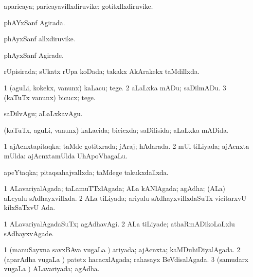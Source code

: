 {\bentry
{} 
\gl{\nA}
\expl{}
\bmng
 aparicaya; paricayavillxdiruvike; gotitxllxdiruvike. 
\emng
\eentry

\bentry
{} 
\gl{\gu}
\expl{}
\bmng
phAYxSanf Agirada. 
\emng
\eentry

\bentry
{} 
\gl{\nA}
\expl{}
\bmng
phAyxSanf allxdiruvike. 
\emng
\eentry

\bentry
{} 
\gl{\kirxvi}
\expl{}
\bmng
phAyxSanf Agirade. 
\emng
\eentry

\bentry
{} 
\gl{\gu}
\expl{}
\bmng
 rUpisirada; sUkatx rUpa koDada; takakx AkArakekx taMdillxda. 
\emng
\eentry

\bentry
{} 
\gl{\sakirx}
\expl{}
\bmng
\bnum
\num{1} (aguLi, kokekx, \mo vanunx) kaLacu; tege. 
\num{2} aLaLxka mADu; saDilmADu. 
\num{3} (kaTuTx \mo vanunx) bicucx; tege. 
\enum
\emng

\noindent
\gl{\akirx}
\expl{}
\bmng
saDilvAgu; aLaLxkavAgu. 
\emng
\eentry

\bentry
{} 
\gl{\gu}
\expl{}
\bmng
 (kaTuTx, aguLi, \mo vanunx) kaLacida; bicicxda; saDilisida; aLaLxka mADida. 
\emng
\eentry

\bentry
{} 
\gl{\gu}
\expl{}
\bmng
\bnum
\num{1} ajAcnxtapitaqka; taMde gotitxrada; jAraj; hAdarada. 
\num{2} mUl tiLiyada; ajAcnxta mUlda:  ajAcnxtamUlda UhApoVhagaLu. 
\enum
\emng
\eentry

\bentry
{} 
\gl{\gu}
\expl{}
\bmng
 apeYtaqka; pitaqsahajvallxda; taMdege takukxdallxda. 
\emng
\eentry

\bentry
{} 
\gl{\gu}
\expl{}
\bmng
\bnum
\num{1} ALavariyalAgada; taLamuTTxlAgada; ALa kANlAgada; agAdha; (ALa) aLeyalu sAdhayxvillxda. 
\num{2} ALa tiLiyada; ariyalu sAdhayxvillxdaSuTx vicitarxvU kilxSaTxvU Ada. 
\enum
\emng
\eentry

\bentry
{} 
\gl{\kirxvi}
\expl{}
\bmng
\bnum
\num{1} ALavariyalAgadaSuTx; agAdhavAgi. 
\num{2} ALa tiLiyade; athaRmADikoLaLxlu sAdhayxvAgade. 
\enum
\emng
\eentry

\bentry
{} 
\gl{\gu}
\expl{}
\bmng
\bnum
\num{1} (manuSayxna savxBAva \mo vugaLa \vi) ariyada; ajAcnxta; kaMDuhiDiyalAgada. 
\num{2} (aparAdha \mo vugaLa \vi) patetx hacacxlAgada; rahasayx BeVdisalAgada. 
\num{3} (samudarx \mo vugaLa \vi) ALavariyada; agAdha. 
\enum
\emng
\eentry

}
